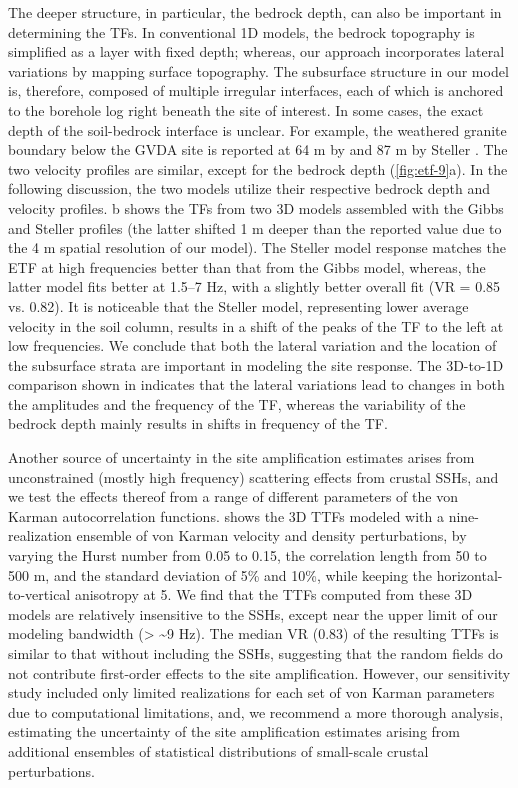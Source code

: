 The deeper structure, in particular, the bedrock depth, can also be important in determining the TFs. In conventional 1D models, the bedrock topography is simplified as a layer with fixed depth; whereas, our approach incorporates lateral variations by mapping surface topography. The subsurface structure in our model is, therefore, composed of multiple irregular interfaces, each of which is anchored to the borehole log right beneath the site of interest. In some cases, the exact depth of the soil-bedrock interface is unclear. For example, the weathered granite boundary below the GVDA site is reported at 64 m by \citet{gibbsNearsurfaceSwaveVelocities1989} and 87 m by Steller \citet{stellerNewBoreholeGeophysical1996}. The two velocity profiles are similar, except for the bedrock depth (\cref{fig:etf-9}a). In the following discussion, the two models utilize their respective bedrock depth and velocity profiles. b shows the TFs from two 3D models assembled with the Gibbs and Steller profiles (the latter shifted 1 m deeper than the reported value due to the 4 m spatial resolution of our model). The Steller model response matches the ETF at high frequencies better than that from the Gibbs model, whereas, the latter model fits better at 1.5–7 Hz, with a slightly better overall fit (VR = 0.85 vs. 0.82). It is noticeable that the Steller model, representing lower average velocity in the soil column, results in a shift of the peaks of the TF to the left at low frequencies. We conclude that both the lateral variation and the location of the subsurface strata are important in modeling the site response. The 3D-to-1D comparison shown in  indicates that the lateral variations lead to changes in both the amplitudes and the frequency of the TF, whereas the variability of the bedrock depth mainly results in shifts in frequency of the TF.

Another source of uncertainty in the site amplification estimates arises from unconstrained (mostly high frequency) scattering effects from crustal SSHs, and we test the effects thereof from a range of different parameters of the von Karman autocorrelation functions.  shows the 3D TTFs modeled with a nine-realization ensemble of von Karman velocity and density perturbations, by varying the Hurst number from 0.05 to 0.15, the correlation length from 50 to 500 m, and the standard deviation of 5\% and 10\%, while keeping the horizontal-to-vertical anisotropy at 5. We find that the TTFs computed from these 3D models are relatively insensitive to the SSHs, except near the upper limit of our modeling bandwidth (> \textasciitilde 9 Hz). The median VR (0.83) of the resulting TTFs is similar to that without including the SSHs, suggesting that the random fields do not contribute first-order effects to the site amplification. However, our sensitivity study included only limited realizations for each set of von Karman parameters due to computational limitations, and, we recommend a more thorough analysis, estimating the uncertainty of the site amplification estimates arising from additional ensembles of statistical distributions of small-scale crustal perturbations.

